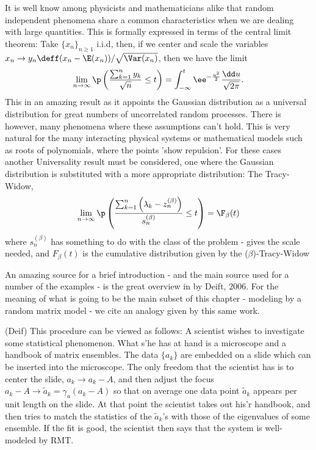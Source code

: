 It is well know among physicists and mathematicians alike that random independent phenomena share a common characteristics when we are dealing with large quantities. This is formally expressed in terms of the central limit theorem: Take $\{x_n\}_{n\geq1}$ i.i.d, then, if we center and scale the variables $x_n \rightarrow y_n \deff (x_n - \E(x_n)) / \sqrt{\Var(x_n)}$, then we have the limit
\begin{equation}
	\lim_{n\rightarrow \infty} \p\left( \frac{\sum_{k=1}^{n} y_k}{\sqrt{n}} \leq t \right) = \int_{-\infty}^t \ee^{-\frac{u^2}{2}} \frac{\dd u}{\sqrt{2\pi}}.
\end{equation} 
This in an amazing result as it appoints the Gaussian distribution as a universal distribution for great numbers of uncorrelated random processes.  There is however, many phenomena where these assumptions can't hold. This is very natural for the many interacting physical systems or mathematical models such as roots of polynomials, where the points 'show repulsion'. For these cases another Universality result must be considered, one where the Gaussian distribution is substituted with a more appropriate distribution: The Tracy-Widow,
\begin{equation}
	\lim_{n\rightarrow \infty} \p\left( \frac{\sum_{k=1}^{n} \left( \lambda_k - z_n^{(\beta)}\right)}{s^{(\beta)}_n} \leq t \right) = \F_{\beta}(t)
\end{equation}
where $s_n^{(\beta)}$ has something to do with the class of the problem - gives the scale needed, and $F_\beta(t)$ is the cumulative distribution given by the ($\beta$)-Tracy-Widow

An amazing source for a brief introduction - and the main source used for a number of the examples - is the great overview in \cite{deift2006universalitymathematicalphysicalsystems} by Deift, $2006$. For the meaning of what is going to be the main subset of this chapter - modeling by a random matrix model - we cite an analogy given by this same work.

\begin{sic}
	(Deif)
	This procedure can  be viewed as follows: A scientist wishes to investigate some statistical phenomenon. What s’he has at hand is a microscope and a handbook of matrix ensembles. The data $\{a_k\}$ are embedded on a slide which can be inserted into the microscope. The only freedom that the scientist has is to center the slide, $a_k \rightarrow a_k - A$, and then adjust the focus $a_k - A \rightarrow \tilde{a}_k = \gamma_a(a_k - A)$ so that on average one data point $\tilde{a}_k$ appears per unit length on the slide. At that point the scientist takes out his’r handbook, and then tries to match the statistics of the $\tilde{a}_k$’s with those of the eigenvalues of some ensemble. If the fit is good, the scientist then says that the system is well-modeled by RMT.
\end{sic}

